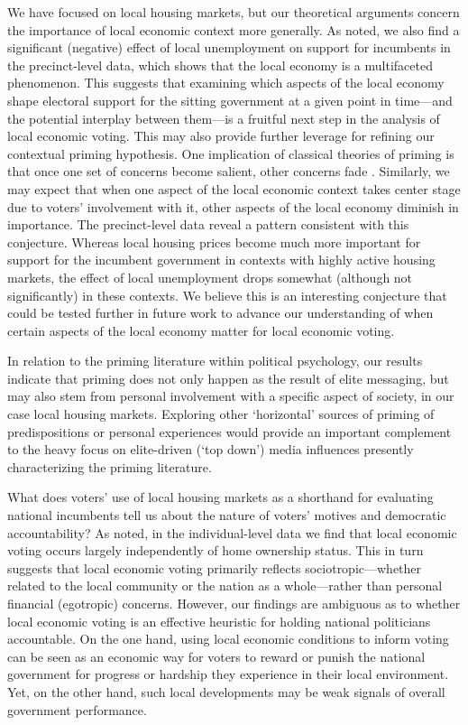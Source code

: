 \documentclass[12pt,a4paper]{article}
\begin{document}
	We have focused on local housing markets, but our theoretical arguments concern the importance of local economic context more generally. As noted, we also find a significant (negative) effect of local unemployment on support for incumbents in the precinct-level data, which shows that the local economy is a multifaceted phenomenon. This suggests that examining which aspects of the local economy shape electoral support for the sitting government at a given point in time—and the potential interplay between them—is a fruitful next step in the analysis of local economic voting. This may also provide further leverage for refining our contextual priming hypothesis. One implication of classical theories of priming is that once one set of concerns become salient, other concerns fade \citep{ krosnick1990altering}. Similarly, we may expect that when one aspect of the local economic context takes center stage due to voters’ involvement with it, other aspects of the local economy diminish in importance. The precinct-level data reveal a pattern consistent with this conjecture. Whereas local housing prices become much more important for support for the incumbent government in contexts with highly active housing markets, the effect of local unemployment drops somewhat (although not significantly) in these contexts. We believe this is an interesting conjecture that could be tested further in future work to advance our understanding of when certain aspects of the local economy matter for local economic voting.
	
	In relation to the priming literature within political psychology, our results indicate that priming does not only happen as the result of elite messaging, but may also stem from personal involvement with a specific aspect of society, in our case local housing markets. Exploring other `horizontal’ sources of priming of predispositions or personal experiences would provide an important complement to the heavy focus on elite-driven (‘top down’) media influences presently characterizing the priming literature. 
	
	What does voters’ use of local housing markets as a shorthand for evaluating national incumbents tell us about the nature of voters’ motives and democratic accountability? As noted, in the individual-level data we find that local economic voting occurs largely independently of home ownership status. This in turn suggests that local economic voting primarily reflects sociotropic—whether related to the local community or the nation as a whole—rather than personal financial (egotropic) concerns. However, our findings are ambiguous as to whether local economic voting is an effective heuristic for holding national politicians accountable. On the one hand, using local economic conditions to inform voting can be seen as an economic way for voters to reward or punish the national government for progress or hardship they experience in their local environment. Yet, on the other hand, such local developments may be weak signals of overall government performance.
	
\end{document}
